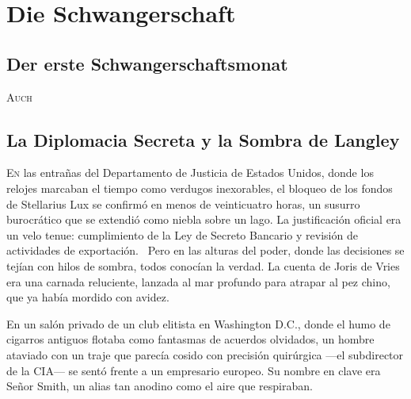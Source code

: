 \part*{Die Schwangerschaft}


\chapter*{Der erste Schwangerschaftsmonat}

\lettrine[lines=2, loversize=0.3, lraise=0]{\initfamily A}{uch}

\chapter{La Diplomacia Secreta y la Sombra de Langley}

\lettrine[lines=2, loversize=0.3, lraise=0]{E}{n} las entrañas del Departamento de Justicia de Estados Unidos, donde los relojes marcaban el tiempo como verdugos inexorables, el bloqueo de los fondos de Stellarius Lux se confirmó en menos de veinticuatro horas, un susurro burocrático que se extendió como niebla sobre un lago. La justificación oficial era un velo tenue: \glqq cumplimiento de la Ley de Secreto Bancario y revisión de actividades de exportación.\grqq~ Pero en las alturas del poder, donde las decisiones se tejían con hilos de sombra, todos conocían la verdad. La cuenta de Joris de Vries era una carnada reluciente, lanzada al mar profundo para atrapar al pez chino, que ya había mordido con avidez.

En un salón privado de un club elitista en Washington D.C., donde el humo de cigarros antiguos flotaba como fantasmas de acuerdos olvidados, un hombre ataviado con un traje que parecía cosido con precisión quirúrgica ---el subdirector de la CIA--- se sentó frente a un empresario europeo. Su nombre en clave era \glqq Señor Smith\grqq, un alias tan anodino como el aire que respiraban.

